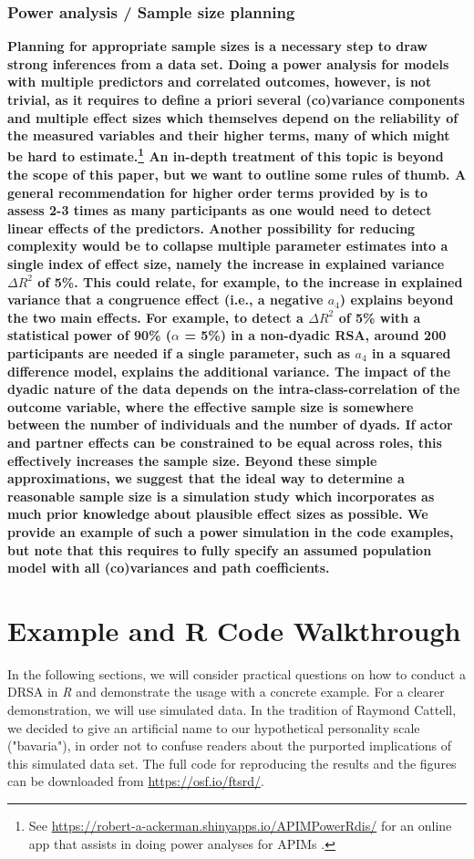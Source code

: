 \documentclass[jou,a4paper,draftfirst]{apa6}
\newcommand{\added}[1]{\textcolor{colour_added}{\bf{#1}}}
\begin{document}
\subsubsection{Power analysis / Sample size planning}
\added{
Planning for appropriate sample sizes is a necessary step to draw strong inferences from a data set. Doing a power analysis for models with multiple predictors and correlated outcomes, however, is not trivial, as it requires to define a priori several (co)variance components and multiple effect sizes which themselves depend on the reliability of the measured variables and their higher terms, many of which might be hard to estimate.\footnote{See \url{https://robert-a-ackerman.shinyapps.io/APIMPowerRdis/} for an online app that assists in doing power analyses for APIMs \parencite{Ackerman_Kenny_2016}.} An in-depth treatment of this topic is beyond the scope of this paper, but we want to outline some rules of thumb. A general recommendation for higher order terms provided by \textcite{Aiken_West_1991} is to assess 2-3 times as many participants as one would need to detect linear effects of the predictors. Another possibility for reducing complexity would be to collapse multiple parameter estimates into a single index of effect size, namely the increase in explained variance $\Delta R^2$ of 5\%. This could relate, for example, to the increase in explained variance that a congruence effect (i.e., a negative $a_4$) explains beyond the two main effects. For example, to detect a $\Delta R^2$ of 5\% with a statistical power of 90\% ($\alpha$ = 5\%) in a non-dyadic RSA, around 200 participants are needed if a single parameter, such as $a_4$ in a squared difference model, explains the additional variance. The impact of the dyadic nature of the data depends on the intra-class-correlation of the outcome variable, where the effective sample size is somewhere between the number of individuals and the number of dyads. If actor and partner effects can be constrained to be equal across roles, this effectively increases the sample size. Beyond these simple approximations, we suggest that the ideal way to determine a reasonable sample size is a simulation study \parencite{NestlerEtAl2015} which incorporates as much prior knowledge about plausible effect sizes as possible. We provide an example of such a power simulation in the code examples, but note that this requires to fully specify an assumed population model with all (co)variances and path coefficients.
}

\section{Example and R Code Walkthrough} 
In the following sections, we will consider practical questions on how to conduct a DRSA in \textit{R} and demonstrate the usage with a concrete example. For a clearer demonstration, we will use simulated data. In the tradition of Raymond Cattell, we decided to give an artificial name to our hypothetical personality scale ("bavaria"), in order not to confuse readers about the purported implications of this simulated data set. The full code for reproducing the results and the figures can be downloaded from \url{https://osf.io/ftsrd/}.
\end{document}
